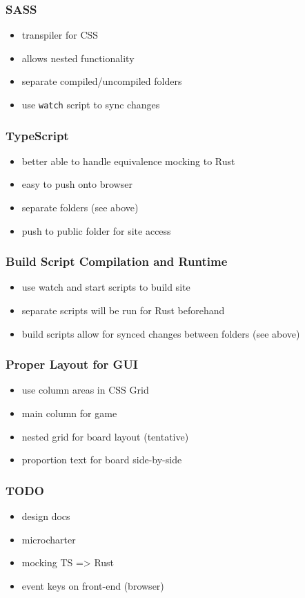 \documentclass[11pt]{article}
\begin{document}
\subsubsection*{SASS}
\label{sec:org845a42e}
\begin{itemize}
\item transpiler for CSS
\item allows nested functionality
\item separate compiled/uncompiled folders
\item use \texttt{watch} script to sync changes
\end{itemize}
\subsubsection*{TypeScript}
\label{sec:org42a5b66}
\begin{itemize}
\item better able to handle equivalence mocking to Rust
\item easy to push onto browser
\item separate folders (see above)
\item push to public folder for site access
\end{itemize}
\subsubsection*{Build Script Compilation and Runtime}
\label{sec:orga8b2fb9}
\begin{itemize}
\item use watch and start scripts to build site
\item separate scripts will be run for Rust beforehand
\item build scripts allow for synced changes between folders (see above)
\end{itemize}
\subsubsection*{Proper Layout for GUI}
\label{sec:orgb5b80e8}
\begin{itemize}
\item use column areas in CSS Grid
\item main column for game
\item nested grid for board layout (tentative)
\item proportion text for board side-by-side
\end{itemize}
\subsubsection*{{\bfseries\sffamily TODO} }
\label{sec:org9dd1ffe}
\begin{itemize}
\item design docs
\item microcharter
\item mocking TS => Rust
\item event keys on front-end (browser)
\end{itemize}
\end{document}
